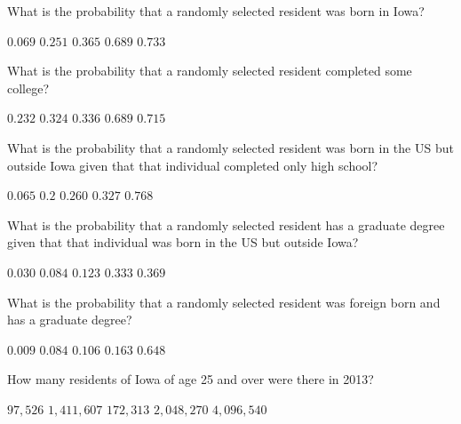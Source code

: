 \documentclass[answers,12pt]{exam}
\begin{document}
\begin{questions}

\question\label{FirstIowa} What is the probability that a randomly selected
resident was born in Iowa?\\
\begin{oneparchoices}
\choice $0.069$ %
\choice $0.251$ %
\choice $0.365$ %
\correctchoice $0.689$
\choice $0.733$ %
\end{oneparchoices}

\question What is the probability that a randomly selected
resident completed some college?\\
\begin{oneparchoices}
\choice $0.232$ %
\correctchoice $0.324$
\choice $0.336$ %
\choice $0.689$ %
\choice $0.715$ %
\end{oneparchoices}

\question What is the probability that a randomly selected
resident was born in the US but outside Iowa given that
that individual completed only high school?\\
\begin{oneparchoices}
\choice $0.065$ %
\correctchoice $0.2$
\choice $0.260$ %
\choice $0.327$ %
\choice $0.768$ %
\end{oneparchoices}

\question What is the probability that a randomly selected
resident has a graduate degree given that
that individual was born in the US but outside Iowa?\\
\begin{oneparchoices}
\choice $0.030$ %
\choice $0.084$ %
\correctchoice $0.123$
\choice $0.333$ %
\choice $0.369$ %
\end{oneparchoices}

\question What is the probability that a randomly selected
resident was foreign born and has a graduate degree?\\
\begin{oneparchoices}
\correctchoice $0.009$
\choice $0.084$ %
\choice $0.106$ %
\choice $0.163$ %
\choice $0.648$ %
\end{oneparchoices}

\question\label{LastIowa} How many residents of Iowa 
of age 25 and over were there in 2013?\\
\begin{oneparchoices}
\choice $97,526$
\choice $1,411,607$
\choice $172,313$
\correctchoice $2,048,270$
\choice $4,096,540$ %
\end{oneparchoices}


\end{questions}
\end{document}
